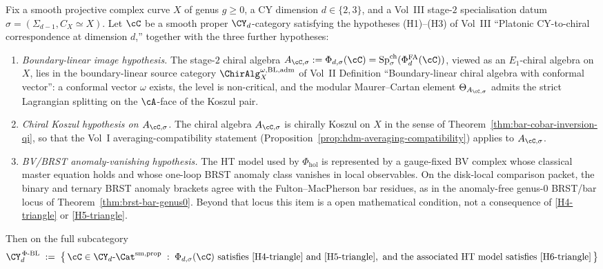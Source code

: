 \begin{theorem}
Fix a smooth projective complex curve $X$ of genus $g \geq 0$, a CY
dimension $d \in \{2, 3\}$, and a Vol~III stage-$2$ specialisation
datum $\sigma=(\Sigma_{d-1},C_X\simeq X)$. Let $\cC$ be a smooth proper
$\CY_d$-category satisfying the hypotheses
\textup{(H1)--(H3)} of Vol~III
``Platonic CY-to-chiral correspondence at dimension $d$,'' together
with the three further hypotheses:
\begin{enumerate}[label=\textup{(H\arabic*$_\triangle$)}, start=4]
\item\label{H4-triangle} \emph{Boundary-linear image hypothesis.} The
 stage-$2$ chiral algebra
 $A_{\cC,\sigma}:=\Phi_{d,\sigma}(\cC)
 =\mathrm{Sp}^{\mathrm{ch}}_{\sigma}(\Phi^{\mathrm{FA}}_d(\cC))$, viewed as an
 $E_1$-chiral algebra on $X$, lies in the boundary-linear
 source category $\ChirAlg^{\omega,\mathrm{BL,adm}}_X$ of Vol~II
 Definition ``Boundary-linear chiral algebra with conformal
 vector'': a conformal vector $\omega$ exists, the level is
 non-critical, and the modular Maurer--Cartan element
 $\Theta_{A_{\cC,\sigma}}$ admits the strict Lagrangian splitting on the
 $\cA$-face of the Koszul pair.
\item\label{H5-triangle} \emph{Chiral Koszul hypothesis on $A_{\cC,\sigma}$.} The
 chiral algebra $A_{\cC,\sigma}$ is chirally Koszul on $X$ in the sense of
Theorem~\textup{\ref{thm:bar-cobar-inversion-qi}}, so that the
 Vol~I averaging-compatibility statement
 \textup{(}Proposition~\textup{\ref{prop:hdm-averaging-compatibility}}\textup{)}
 applies to $A_{\cC,\sigma}$.
\item\label{H6-triangle} \emph{BV/BRST anomaly-vanishing hypothesis.}
 The HT model used by $\Phi_{\mathrm{hol}}$ is represented by a
 gauge-fixed BV complex whose classical master equation holds and
 whose one-loop BRST anomaly class vanishes in local observables. On
 the disk-local comparison packet, the binary and ternary BRST anomaly
 brackets agree with the Fulton--MacPherson bar residues, as in the
 anomaly-free genus-$0$ BRST/bar locus of
 Theorem~\textup{\ref{thm:brst-bar-genus0}}. Beyond that locus this
 item is a open mathematical condition, not a consequence of
 \textup{\ref{H4-triangle}} or \textup{\ref{H5-triangle}}.
\end{enumerate}
Then on the full subcategory
\[
 \CY_d^{\,\Phi\text{-BL}}
 \;:=\;
 \bigl\{\, \cC \in \CY_d\text{-}\Cat^{\mathrm{sm,prop}}
 \;:\;
 \Phi_{d,\sigma}(\cC) \text{ satisfies}~\textup{\ref{H4-triangle}}\text{ and}~\textup{\ref{H5-triangle}},
 \text{ and the associated HT model satisfies}~\textup{\ref{H6-triangle}}\,\bigr\}
\]
\end{theorem}
